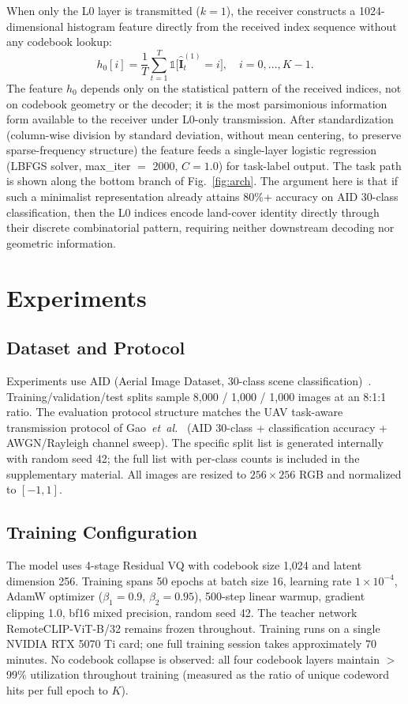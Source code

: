 \documentclass[lettersize,journal]{IEEEtran}
\begin{document}
When only the L0 layer is transmitted ($k=1$), the receiver constructs a 1024-dimensional histogram feature directly from the received index sequence without any codebook lookup:
\begin{equation}
h_0[i] = \frac{1}{T} \sum_{t=1}^{T} \mathbb{1}\bigl[\hat{\mathbf{I}}_t^{(1)} = i\bigr], \quad i = 0,\dots,K-1.
\end{equation}
The feature $h_0$ depends only on the statistical pattern of the received indices, not on codebook geometry or the decoder; it is the most parsimonious information form available to the receiver under L0-only transmission. After standardization (column-wise division by standard deviation, without mean centering, to preserve sparse-frequency structure) the feature feeds a single-layer logistic regression (LBFGS solver, max\_iter $=$ 2000, $C=1.0$) for task-label output. The task path is shown along the bottom branch of Fig.~\ref{fig:arch}. The argument here is that if such a minimalist representation already attains 80\%+ accuracy on AID 30-class classification, then the L0 indices encode land-cover identity directly through their discrete combinatorial pattern, requiring neither downstream decoding nor geometric information.

\section{Experiments}

\subsection{Dataset and Protocol}
Experiments use AID (Aerial Image Dataset, 30-class scene classification)~\cite{xia2017aid}. Training/validation/test splits sample 8{,}000 / 1{,}000 / 1{,}000 images at an 8:1:1 ratio. The evaluation protocol structure matches the UAV task-aware transmission protocol of Gao~\textit{et~al.}~\cite{gao2022task} (AID 30-class + classification accuracy + AWGN/Rayleigh channel sweep). The specific split list is generated internally with random seed 42; the full list with per-class counts is included in the supplementary material. All images are resized to $256\times 256$ RGB and normalized to $[-1,1]$.

\subsection{Training Configuration}
The model uses 4-stage Residual VQ with codebook size 1{,}024 and latent dimension 256. Training spans 50 epochs at batch size 16, learning rate $1\times 10^{-4}$, AdamW optimizer ($\beta_1=0.9$, $\beta_2=0.95$), 500-step linear warmup, gradient clipping 1.0, bf16 mixed precision, random seed 42. The teacher network RemoteCLIP-ViT-B/32 remains frozen throughout. Training runs on a single NVIDIA RTX 5070 Ti card; one full training session takes approximately 70 minutes. No codebook collapse is observed: all four codebook layers maintain $>$\,99\% utilization throughout training (measured as the ratio of unique codeword hits per full epoch to $K$).
\end{document}
